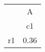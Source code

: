 \begin{tabular}{l*{1}{c}}
\hline\hline
            &           A\\
            &          c1\\
\hline
r1          &        0.36\\
\hline\hline
\end{tabular}
